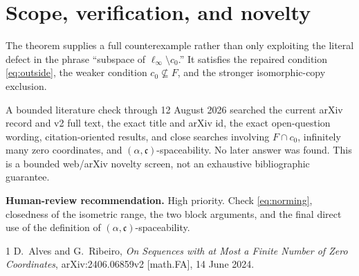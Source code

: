 \documentclass[11pt]{article}
\newcommand{\cC}{\mathfrak c}
\begin{document}
\section{Scope, verification, and novelty}

The theorem supplies a full counterexample rather than only exploiting the
literal defect in the phrase ``subspace of $\ell_\infty\setminus c_0$.''  It
satisfies the repaired condition \eqref{eq:outside}, the weaker condition
$c_0\nsubseteq F$, and the stronger isomorphic-copy exclusion.

A bounded literature check through 12 August 2026 searched the current arXiv
record and v2 full text, the exact title and arXiv id, the exact open-question
wording, citation-oriented results, and close searches involving
$F\cap c_0$, infinitely many zero coordinates, and
$(\alpha,\cC)$-spaceability.  No later answer was found.  This is a bounded
web/arXiv novelty screen, not an exhaustive bibliographic guarantee.

\medskip
\noindent\textbf{Human-review recommendation.}
High priority.  Check \eqref{eq:norming}, closedness of the isometric range,
the two block arguments, and the final direct use of the definition of
$(\alpha,\cC)$-spaceability.

\begin{thebibliography}{1}
D.~Alves and G.~Ribeiro,
\emph{On Sequences with at Most a Finite Number of Zero Coordinates},
arXiv:2406.06859v2 [math.FA], 14 June 2024.
\end{thebibliography}
\end{document}
